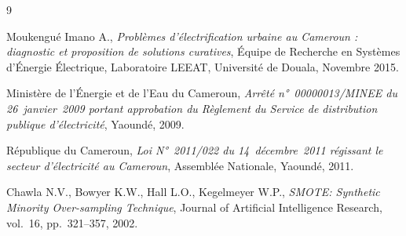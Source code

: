 \documentclass[12pt,a4paper]{article}
\begin{document}
\begin{thebibliography}{9}

  Moukengué Imano A.,
  \textit{Problèmes d'électrification urbaine au Cameroun :
  diagnostic et proposition de solutions curatives},
  Équipe de Recherche en Systèmes d'Énergie Électrique,
  Laboratoire LEEAT, Université de Douala, Novembre 2015.

  Ministère de l'Énergie et de l'Eau du Cameroun,
  \textit{Arrêté n°~00000013/MINEE du 26~janvier~2009 portant
  approbation du Règlement du Service de distribution publique
  d'électricité}, Yaoundé, 2009.

  République du Cameroun,
  \textit{Loi N°~2011/022 du 14~décembre~2011 régissant le secteur
  d'électricité au Cameroun}, Assemblée Nationale, Yaoundé, 2011.

  Chawla N.V., Bowyer K.W., Hall L.O., Kegelmeyer W.P.,
  \textit{SMOTE: Synthetic Minority Over-sampling Technique},
  Journal of Artificial Intelligence Research, vol.\ 16,
  pp.\ 321--357, 2002.

\end{thebibliography}
\end{document}

